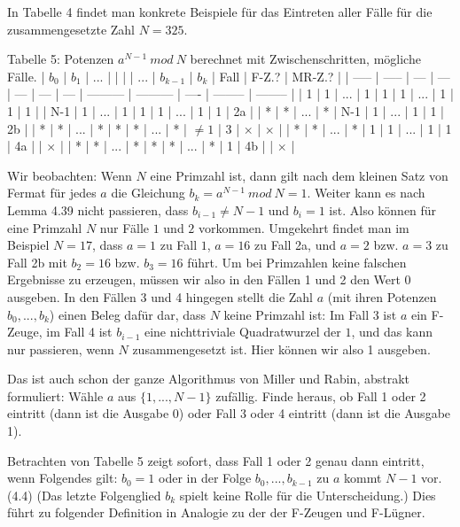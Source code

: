 \documentclass[a4paper]{article}
\begin{document}
\begin{multicols}{3}
        In Tabelle 4 findet man konkrete Beispiele für das Eintreten aller Fälle für die zusammengesetzte Zahl $N=325$.

        Tabelle 5: Potenzen $a^{N-1}\ mod\ N$ berechnet mit Zwischenschritten, mögliche Fälle.
        | $b_0$ | $b_1$ | ... |     |     |     | ... | $b_{k-1}$ | $b_k$     | Fall | F-Z.?    | MR-Z.?   |
        | ----- | ----- | --- | --- | --- | --- | --- | --------- | --------- | ---- | -------- | -------- |
        | 1     | 1     | ... | 1   | 1   | 1   | ... | 1         | 1         | 1    |
        | N-1   | 1     | ... | 1   | 1   | 1   | ... | 1         | 1         | 2a   |
        | *     | *     | ... | *   | N-1 | 1   | ... | 1         | 1         | 2b   |
        | *     | *     | ... | *   | *   | *   | ... | *         | $\not= 1$ | 3    | $\times$ | $\times$ |
        | *     | *     | ... | *   | 1   | 1   | ... | 1         | 1         | 4a   |          | $\times$ |
        | *     | *     | ... | *   | *   | *   | ... | *         | 1         | 4b   |          | $\times$ |

        Wir beobachten: Wenn $N$ eine Primzahl ist, dann gilt nach dem kleinen Satz von Fermat für jedes $a$ die Gleichung $b_k=a^{N-1}\ mod\ N=1$. Weiter kann es nach Lemma 4.39 nicht passieren, dass $b_{i-1}\not=N-1$ und $b_i=1$ ist. Also können für eine Primzahl $N$ nur Fälle $1$ und $2$ vorkommen. Umgekehrt findet man im Beispiel $N=17$, dass $a=1$ zu Fall $1$, $a=16$ zu Fall 2a, und $a=2$ bzw. $a=3$ zu Fall 2b mit $b_2=16$ bzw. $b_3=16$ führt. Um bei Primzahlen keine falschen Ergebnisse zu erzeugen, müssen wir also in den Fällen 1 und 2 den Wert 0 ausgeben. In den Fällen 3 und 4 hingegen stellt die Zahl $a$ (mit ihren Potenzen $b_0,...,b_k$) einen Beleg dafür dar, dass $N$ keine Primzahl ist: Im Fall 3 ist $a$ ein F-Zeuge, im Fall 4 ist $b_{i-1}$ eine nichttriviale Quadratwurzel der $1$, und das kann nur passieren, wenn $N$ zusammengesetzt ist. Hier können wir also 1 ausgeben.

        Das ist auch schon der ganze Algorithmus von Miller und Rabin, abstrakt formuliert: Wähle $a$ aus $\{1,...,N-1\}$ zufällig. Finde heraus, ob Fall 1 oder 2 eintritt (dann ist die Ausgabe 0) oder Fall 3 oder 4 eintritt (dann ist die Ausgabe 1).

        Betrachten von Tabelle 5 zeigt sofort, dass Fall 1 oder 2 genau dann eintritt, wenn Folgendes gilt: $b_0=1$ oder in der Folge $b_0,...,b_{k-1}$ zu $a$ kommt $N-1$ vor. (4.4) (Das letzte Folgenglied $b_k$ spielt keine Rolle für die Unterscheidung.) Dies führt zu folgender Definition in Analogie zu der der F-Zeugen und F-Lügner.


\end{multicols}
\end{document}
